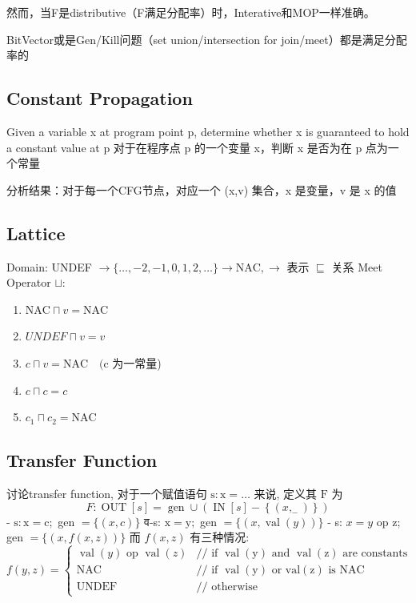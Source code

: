 \documentclass[a4paper]{article}
\theoremstyle{definition}
\begin{document}
然而，当F是distributive（F满足分配率）时，Interative和MOP一样准确。

BitVector或是Gen/Kill问题（set union/intersection for join/meet）都是满足分配率的

\subsection{Constant Propagation}

Given a variable x at program point p, determine whether x is guaranteed to hold a constant value at p
对于在程序点 p 的一个变量 x，判断 x 是否为在 p 点为一个常量

分析结果：对于每一个CFG节点，对应一个 (x,v) 集合，x 是变量，v 是 x 的值
\subsection{Lattice}
Domain: UNDEF $\rightarrow\{\ldots,-2,-1,0,1,2, \ldots\} \rightarrow \mathrm{NAC}, \rightarrow$ 表示 $\sqsubseteq$ 关系
Meet Operator $\sqcup$:
\begin{enumerate}
   
  \item $\mathrm{NAC} \sqcap v=\mathrm{NAC}$
  \item $UNDEF \sqcap v=v$
  \item $c \sqcap v=\mathrm{NAC} \quad(\mathrm{c}$ 为一常量)
  \item $c \sqcap c=c$
  \item $c_{1} \sqcap c_{2}=\mathrm{NAC}$
\end{enumerate}

\subsection{Transfer Function}
讨论transfer function, 对于一个赋值语句 $\mathrm{s}: \mathrm{x}=\ldots$ 来说, 定义其 $\mathrm{F}$ 为
$$
F: \operatorname{OUT}[s]=\operatorname{gen} \cup\left(\operatorname{IN}[s]-\left\{\left(x,_{-}\right)\right\}\right)
$$
- $\mathrm{s}: \mathrm{x}=\mathrm{c} ;$ gen $=\{(x, c)\}$
व-s: $\mathrm{x}=\mathrm{y} ;$ gen $=\{(x, \operatorname{val}(y))\}$
- s: $x=y$ op z; gen $=\{(x, f(x, z))\}$
而 $f(x, z)$ 有三种情况:
$$
f(y, z)=\left\{\begin{array}{ll}
\operatorname{val}(y) \text { op } \operatorname{val}(z) & / / \text { if } \operatorname{val}(\mathrm{y}) \text { and } \operatorname{val}(\mathrm{z}) \text { are constants } \\
\mathrm{NAC} & / / \text { if } \operatorname{val}(\mathrm{y}) \text { or } \mathrm{val}(\mathrm{z}) \text { is } \mathrm{NAC} \\
\mathrm{UNDEF} & / / \text { otherwise }
\end{array}\right.
$$
\end{document}
